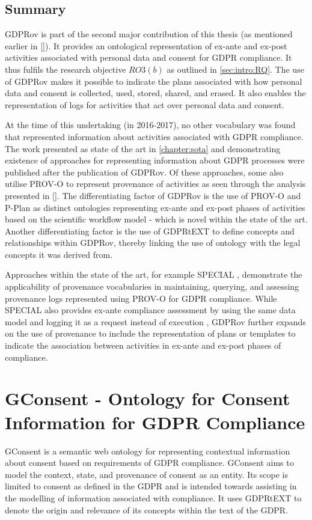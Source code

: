 \subsection*{Summary}
GDPRov is part of the second major contribution of this thesis (as mentioned earlier in \autoref{}). It provides an ontological representation of ex-ante and ex-post activities associated with personal data and consent for GDPR compliance.
It thus fulfils the research objective $RO3(b)$ as outlined in \autoref{sec:intro:RQ}. 
The use of GDPRov makes it possible to indicate the plans associated with how personal data and consent is collected, used, stored, shared, and erased.
It also enables the representation of logs for activities that act over personal data and consent.

At the time of this undertaking (in 2016-2017), no other vocabulary was found that represented information about activities associated with GDPR compliance.
The work presented as state of the art in \autoref{chapter:sota} and demonstrating existence of approaches for representing information about GDPR processes were published after the publication of GDPRov. Of these approaches, some also utilise PROV-O to represent provenance of activities as seen through the analysis presented in \autoref{}. The differentiating factor of GDPRov is the use of PROV-O and P-Plan as distinct ontologies representing ex-ante and ex-post phases of activities based on the scientific workflow model - which is novel within the state of the art. Another differentiating factor is the use of GDPRtEXT to define concepts and relationships within GDPRov, thereby linking the use of ontology with the legal concepts it was derived from.

Approaches within the state of the art, for example SPECIAL \cite{}, demonstrate the applicability of provenance vocabularies in maintaining, querying, and assessing provenance logs represented using PROV-O for GDPR compliance.
While SPECIAL also provides ex-ante compliance assessment by using the same data model and logging it as a request instead of execution \cite{}, GDPRov further expands on the use of provenance to include the representation of plans or templates to indicate the association between activities in ex-ante and ex-post phases of compliance.

\section{GConsent - Ontology for Consent Information for GDPR Compliance}\label{sec:voc:GConsent}
GConsent is a semantic web ontology for representing contextual information about consent based on requirements of GDPR compliance. 
GConsent aims to model the context, state, and provenance of consent as an entity.
Its scope is limited to consent as defined in the GDPR and is intended towards assisting in the modelling of information associated with compliance.
It uses GDPRtEXT to denote the origin and relevance of its concepts within the text of the GDPR.

